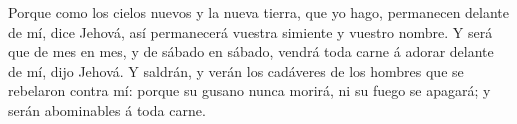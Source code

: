  Porque como los cielos nuevos y la nueva tierra, que yo
hago, permanecen delante de mí, dice Jehová, así permanecerá vuestra
simiente y vuestro nombre.  Y será que de mes en mes, y de
sábado en sábado, vendrá toda carne á adorar delante de mí, dijo Jehová.
 Y saldrán, y verán los cadáveres de los hombres que se
rebelaron contra mí: porque su gusano nunca morirá, ni su fuego se
apagará; y serán abominables á toda carne.
